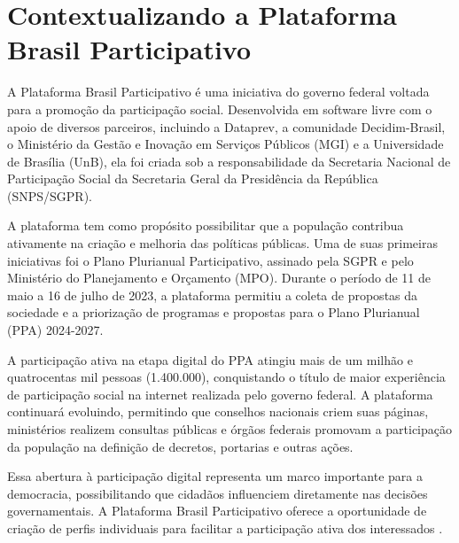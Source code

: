 \section{Contextualizando a Plataforma Brasil Participativo}

A Plataforma Brasil Participativo é uma iniciativa do governo federal voltada para a promoção da participação social. Desenvolvida em software livre com o apoio de diversos parceiros, incluindo a Dataprev, a comunidade Decidim-Brasil, o Ministério da Gestão e Inovação em Serviços Públicos (MGI) e a Universidade de Brasília (UnB), ela foi criada sob a responsabilidade da Secretaria Nacional de Participação Social da Secretaria Geral da Presidência da República (SNPS/SGPR).

A plataforma tem como propósito possibilitar que a população contribua ativamente na criação e melhoria das políticas públicas. Uma de suas primeiras iniciativas foi o Plano Plurianual Participativo, assinado pela SGPR e pelo Ministério do Planejamento e Orçamento (MPO). Durante o período de 11 de maio a 16 de julho de 2023, a plataforma permitiu a coleta de propostas da sociedade e a priorização de programas e propostas para o Plano Plurianual (PPA) 2024-2027.

A participação ativa na etapa digital do PPA atingiu mais de um milhão e quatrocentas mil pessoas (1.400.000), conquistando o título de maior experiência de participação social na internet realizada pelo governo federal. A plataforma continuará evoluindo, permitindo que conselhos nacionais criem suas páginas, ministérios realizem consultas públicas e órgãos federais promovam a participação da população na definição de decretos, portarias e outras ações.

Essa abertura à participação digital representa um marco importante para a democracia, possibilitando que cidadãos influenciem diretamente nas decisões governamentais. A Plataforma Brasil Participativo oferece a oportunidade de criação de perfis individuais para facilitar a participação ativa dos interessados \cite{brasilparticipativo-sobre}.